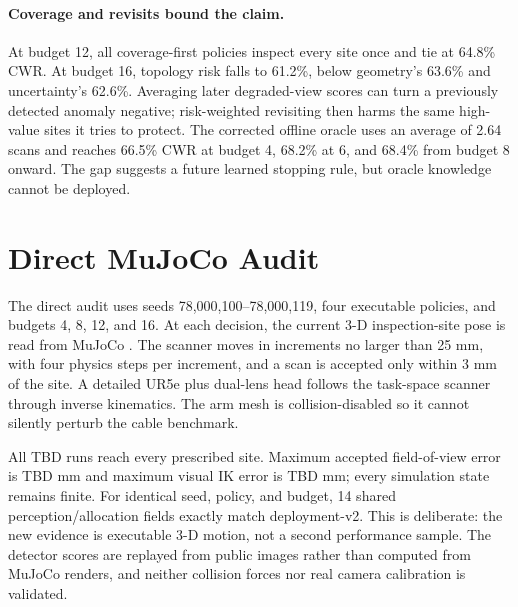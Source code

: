 \documentclass[journal]{IEEEtran}
\newcommand{\MuJoCoRuns}{TBD}
\newcommand{\MuJoCoFOVmm}{TBD}
\newcommand{\MuJoCoIKmm}{TBD}
\begin{document}
\paragraph{Coverage and revisits bound the claim.}
At budget 12, all coverage-first policies inspect every site once and tie at
64.8\% CWR.  At budget 16, topology risk falls to 61.2\%, below geometry's
63.6\% and uncertainty's 62.6\%.  Averaging later degraded-view scores can turn
a previously detected anomaly negative; risk-weighted revisiting then harms the
same high-value sites it tries to protect.  The corrected offline oracle uses an
average of 2.64 scans and reaches 66.5\% CWR at budget 4, 68.2\% at 6, and
68.4\% from budget 8 onward.  The gap suggests a future learned stopping rule,
but oracle knowledge cannot be deployed.

\section{Direct MuJoCo Audit}

The direct audit uses seeds 78,000,100--78,000,119, four executable policies,
and budgets 4, 8, 12, and 16.  At each decision, the current 3-D inspection-site
pose is read from MuJoCo \cite{todorov2012mujoco}.  The scanner moves in
increments no larger than 25 mm, with four physics steps per increment, and a
scan is accepted only within 3 mm of the site.  A detailed UR5e plus dual-lens
head follows the task-space scanner through inverse kinematics.  The arm mesh is
collision-disabled so it cannot silently perturb the cable benchmark.

\begin{table}[t]
  \centering
  \caption{Direct execution diagnostics pooled over four budgets per policy.
  Travel is world-space scanner-path length.}
  \label{tab:mujoco}
  \resizebox{\columnwidth}{!}{%
    }
\end{table}

All \MuJoCoRuns{} runs reach every prescribed site.  Maximum accepted
field-of-view error is \MuJoCoFOVmm{} mm and maximum visual IK error is
\MuJoCoIKmm{} mm; every simulation state remains finite.  For identical seed,
policy, and budget, 14 shared perception/allocation fields exactly match
deployment-v2.  This is deliberate: the new evidence is executable 3-D motion,
not a second performance sample.  The detector scores are replayed from public
images rather than computed from MuJoCo renders, and neither collision forces
nor real camera calibration is validated.
\end{document}
